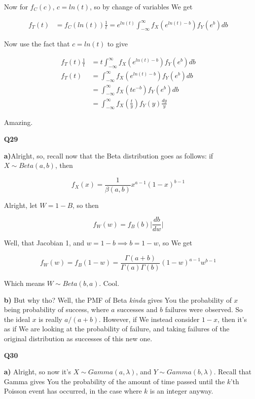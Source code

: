 \documentclass{article}
\begin{document}
			Now for $f_C(c)$, $c=ln(t)$, so by change of variables We get
			
			\begin{align*}
			f_T(t) &= f_C(ln(t))\frac{1}{t} = e^{ln(t)}\int^\infty_{-\infty} f_X(e^{ln(t)-b})f_Y(e^b) db 
			\end{align*}
		
			Now use the fact that $c=ln(t)$ to give
			
			\begin{align*}
			f_T(t)\frac{1}{t}&= t\int^\infty_{-\infty} f_X(e^{ln(t)-b})f_Y(e^b) db\\ 
			f_T(t) &=\int^\infty_{-\infty} f_X(e^{ln(t)-b})f_Y(e^b) db\\
			&=\int^\infty_{-\infty} f_X(te^{-b})f_Y(e^b) db\\
			&=\int^\infty_{-\infty} f_X(\frac{t}{y})f_Y(y) \frac{dy}{y}
			\end{align*}
		
			Amazing.
		
		\textbf{Q29}
		
			\textbf{a)}Alright, so, recall now that the Beta distribution goes as follows: if $X\sim Beta(a, b)$, then
			
			\[ f_X(x) = \frac{1}{\beta(a, b)}x^{a-1}(1-x)^{b-1}  \]
		
			Alright, let $W=1-B$, so then 
			
			\[ f_W(w) = f_B(b)\bigg|\frac{db}{dw}\bigg| \]
			
			Well, that Jacobian 1, and $w=1-b\implies b=1-w$, so We get
			
			\[ f_W(w) = f_B(1-w) = \frac{\Gamma(a+b)}{\Gamma(a)\Gamma(b)}(1-w)^{a-1}w^{b-1} \]
		
			Which means $W\sim Beta(b, a)$. Cool.
			
			\textbf{b)} But why tho? Well, the PMF of Beta \textit{kinda} gives You the probability of $x$ being probability of success, where $a$ successes and $b$ failures were observed. So the ideal $x$ is really $a/(a+b)$. However, if We instead consider $1-x$, then it's as if We are looking at the probability of failure, and taking failures of the original distribution as successes of this new one.
			
			\hfill
			
		\textbf{Q30}
		
			\textbf{a)} Alright, so now it's $X\sim Gamma(a, \lambda)$, and $Y\sim Gamma(b, \lambda)$. Recall that Gamma gives You the probability of the amount of time passed until the $k$'th Poisson event has occurred, in the case where $k$ is an integer anyway.
			
\end{document}
